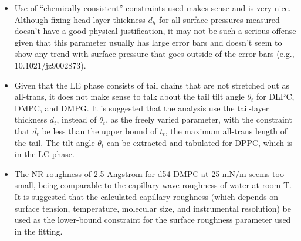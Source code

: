 \documentclass[amsmath,amssymb,twocolumn,superscriptaddress]{revtex4-1}
\begin{document}
\begin{itemize}
\item Use of ``chemically consistent'' constraints used makes sense and is very nice. Although fixing head-layer thickness $d_{h}$ for all surface pressures measured doesn’t have a good physical justification, it may not be such a serious offense given that this parameter usually has large error bars and doesn’t seem to show any trend with surface pressure that goes outside of the error bars (e.g., 10.1021/jz9002873).

\item Given that the LE phase consists of tail chains that are not stretched out as all-trans, it does not make sense to talk about the tail tilt angle $\theta_{t}$ for DLPC, DMPC, and DMPG. It is suggested that the analysis use the tail-layer thickness $d_{t}$, instead of $\theta_{t}$, as the freely varied parameter, with the constraint that $d_{t}$ be less than the upper bound of $t_{t}$, the maximum all-trans length of the tail. The tilt angle $\theta_{t}$ can be extracted and tabulated for DPPC, which is in the LC phase.

\item The NR roughness of 2.5 Angstrom for d54-DMPC at 25 mN/m seems too small, being comparable to the capillary-wave roughness of water at room T. It is suggested that the calculated capillary roughness (which depends on surface tension, temperature, molecular size, and instrumental resolution) be used as the lower-bound constraint for the surface roughness parameter used in the fitting.
\end{itemize}
\end{document}
